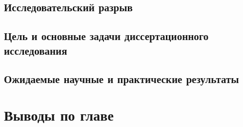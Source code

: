 \subsection{Исследовательский разрыв}
\label{subsec:research-gap}

\subsection{Цель и основные задачи диссертационного исследования}
\label{subsec:goal-tasks}

\subsection{Ожидаемые научные и практические результаты}
\label{subsec:expected-results}

\section{Выводы по главе}
\label{sec:chapter1-conclusions}
